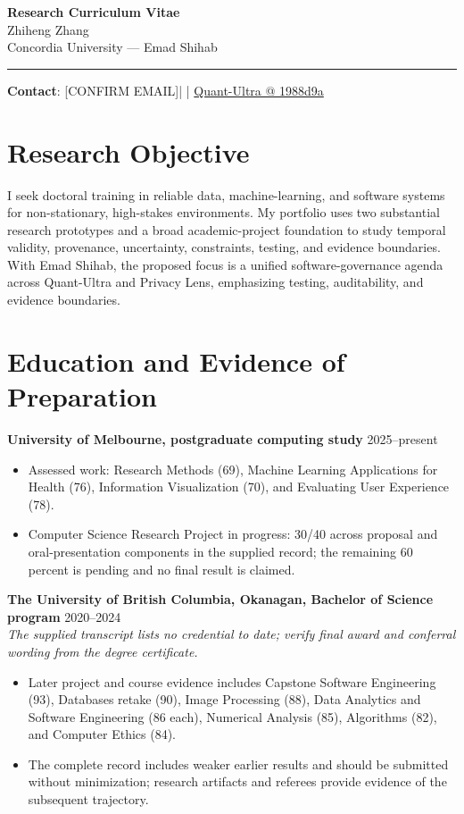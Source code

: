\documentclass[11pt]{article}
\makeatletter
\newcommand{\ApplicantName}{Zhiheng Zhang}
\newcommand{\ApplicantEmail}{[CONFIRM EMAIL]}
\newcommand{\ApplicantPhone}{[CONFIRM PHONE]}
\newcommand{\ApplicantGitHub}{\href{https://github.com/zhiheng-zhang-Mera/Quant-Ultra/tree/1988d9a8530da91a8158de864d098ea869098923}{Quant-Ultra @ 1988d9a}}
\makeatother
\begin{document}
\begin{center}
{\LARGE\bfseries Research Curriculum Vitae}\\[0.25em]
{\large \ApplicantName}\\
Concordia University --- Emad Shihab
\end{center}
\vspace{0.35em}\hrule\vspace{0.65em}

\textbf{Contact}: \ApplicantEmail\quad | \quad \ApplicantPhone\quad | \quad \ApplicantGitHub

\section*{Research Objective}
I seek doctoral training in reliable data, machine-learning, and software systems for non-stationary, high-stakes environments. My portfolio uses two substantial research prototypes and a broad academic-project foundation to study temporal validity, provenance, uncertainty, constraints, testing, and evidence boundaries. With Emad Shihab, the proposed focus is a unified software-governance agenda across Quant-Ultra and Privacy Lens, emphasizing testing, auditability, and evidence boundaries.

\section*{Education and Evidence of Preparation}
\textbf{University of Melbourne, postgraduate computing study} \hfill 2025--present
\begin{itemize}
\item Assessed work: Research Methods (69), Machine Learning Applications for Health (76), Information Visualization (70), and Evaluating User Experience (78).
\item Computer Science Research Project in progress: 30/40 across proposal and oral-presentation components in the supplied record; the remaining 60 percent is pending and no final result is claimed.
\end{itemize}

\textbf{The University of British Columbia, Okanagan, Bachelor of Science program} \hfill 2020--2024\\
\textit{The supplied transcript lists no credential to date; verify final award and conferral wording from the degree certificate.}
\begin{itemize}
\item Later project and course evidence includes Capstone Software Engineering (93), Databases retake (90), Image Processing (88), Data Analytics and Software Engineering (86 each), Numerical Analysis (85), Algorithms (82), and Computer Ethics (84).
\item The complete record includes weaker earlier results and should be submitted without minimization; research artifacts and referees provide evidence of the subsequent trajectory.
\end{itemize}
\end{document}
